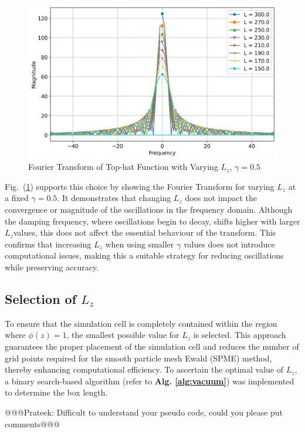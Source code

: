 \begin{figure}[htbp]
  \centering
  \includegraphics[width=\linewidth]{images/fourieroftophatvaryL_gamma0.5.jpg}
  \caption{Fourier Transform of Top-hat Function with Varying $L_z$, $\gamma = 0.5$}
  \label{fig:fourieroftophatvaryL_gamma0}
\end{figure}

Fig.~(\ref{fig:fourieroftophatvaryL_gamma0}) supports this choice by showing the Fourier Transform for varying $L_z$ at a fixed $\gamma = 0.5$. It demonstrates that changing $L_z$ does not impact the convergence or magnitude of the oscillations in the frequency domain. Although the damping frequency, where oscillations begin to decay, shifts higher with larger $L_z$values, this does not affect the essential behaviour of the transform. This confirms that increasing $L_z$ when using smaller $\gamma$ values does not introduce computational issues, making this a suitable strategy for reducing oscillations while preserving accuracy.

\subsection{Selection of  $L_z$}
To ensure that the simulation cell is completely contained within the region where $\phi(z) = 1$, the smallest possible value for $L_z$ is selected. This approach guarantees the proper placement of the simulation cell and reduces the number of grid points required for the smooth particle mesh Ewald (SPME) method, thereby enhancing computational efficiency. To ascertain the optimal value of $L_z$, a binary search-based algorithm (refer to \textbf{Alg. \ref{alg:vacuum}}) was implemented to determine the box length.



@@@Prateek: Difficult to understand your pseudo code, could you please put comments@@@